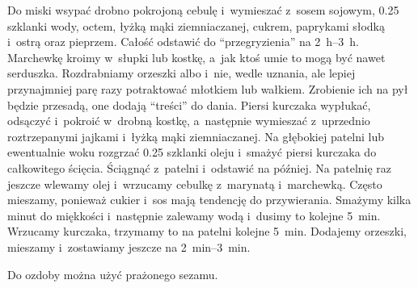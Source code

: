 \documentclass[../kucharek.tex]{subfiles}
\begin{document}
Do miski wsypać drobno pokrojoną cebulę i~wymieszać z~sosem sojowym, \num{.25}
szklanki wody, octem, łyżką mąki ziemniaczanej, cukrem, paprykami słodką
i~ostrą oraz pieprzem. Całość odstawić do \enquote{przegryzienia} na
\qtyrange{2}{3}{\hour}. Marchewkę kroimy w~słupki lub kostkę, a~jak ktoś umie
to mogą być nawet serduszka. Rozdrabniamy orzeszki albo i~nie, wedle uznania,
ale lepiej przynajmniej parę razy potraktować młotkiem lub wałkiem. Zrobienie
ich na pył będzie przesadą, one dodają \enquote{treści} do dania. Piersi
kurczaka wypłukać, odsączyć i~pokroić w~drobną kostkę, a~następnie wymieszać
z~uprzednio roztrzepanymi jajkami i~łyżką mąki ziemniaczanej. Na głębokiej
patelni lub ewentualnie woku rozgrzać \num{.25} szklanki oleju i~smażyć piersi
kurczaka do całkowitego ścięcia. Ściągnąć z~patelni i~odstawić na później. Na
patelnię raz jeszcze wlewamy olej i~wrzucamy cebulkę z~marynatą i~marchewką.
Często mieszamy, ponieważ cukier i~sos mają tendencję do przywierania. Smażymy
kilka minut do miękkości i~następnie zalewamy wodą i~dusimy to kolejne
\qty{5}{\minute}. Wrzucamy kurczaka, trzymamy to na patelni kolejne
\qty{5}{\minute}. Dodajemy orzeszki, mieszamy i~zostawiamy jeszcze na
\qtyrange{2}{3}{\minute}.

Do ozdoby można użyć prażonego sezamu.
\end{document}
